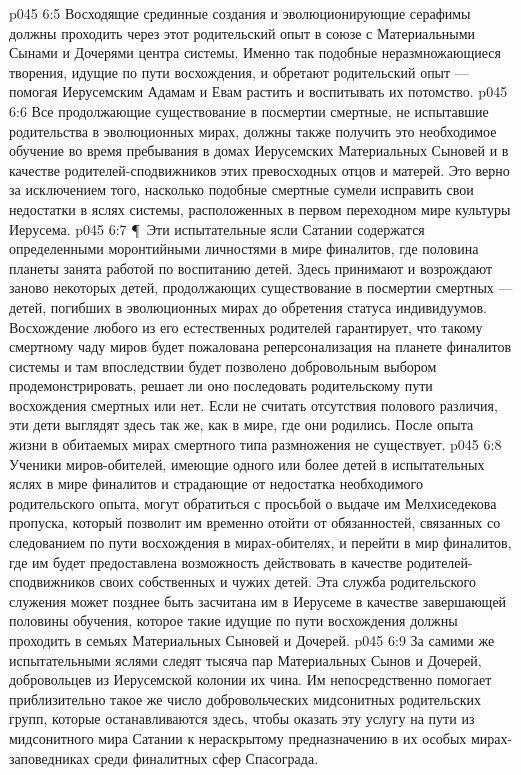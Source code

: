 \vs p045 6:5 Восходящие срединные создания и эволюционирующие серафимы должны проходить через этот родительский опыт в союзе с Материальными Сынами и Дочерями центра системы. Именно так подобные неразмножающиеся творения, идущие по пути восхождения, и обретают родительский опыт --- помогая Иерусемским Адамам и Евам растить и воспитывать их потомство.
\vs p045 6:6 Все продолжающие существование в посмертии смертные, не испытавшие родительства в эволюционных мирах, должны также получить это необходимое обучение во время пребывания в домах Иерусемских Материальных Сыновей и в качестве родителей\hyp{}сподвижников этих превосходных отцов и матерей. Это верно за исключением того, насколько подобные смертные сумели исправить свои недостатки в яслях системы, расположенных в первом переходном мире культуры Иерусема.
\vs p045 6:7 \P\ Эти испытательные ясли Сатании содержатся определенными моронтийными личностями в мире финалитов, где половина планеты занята работой по воспитанию детей. Здесь принимают и возрождают заново некоторых детей, продолжающих существование в посмертии смертных --- детей, погибших в эволюционных мирах до обретения статуса индивидуумов. Восхождение любого из его естественных родителей гарантирует, что такому смертному чаду миров будет пожалована реперсонализация на планете финалитов системы и там впоследствии будет позволено добровольным выбором продемонстрировать, решает ли оно последовать родительскому пути восхождения смертных или нет. Если не считать отсутствия полового различия, эти дети выглядят здесь так же, как в мире, где они родились. После опыта жизни в обитаемых мирах смертного типа размножения не существует.
\vs p045 6:8 Ученики миров\hyp{}обителей, имеющие одного или более детей в испытательных яслях в мире финалитов и страдающие от недостатка необходимого родительского опыта, могут обратиться с просьбой о выдаче им Мелхиседекова пропуска, который позволит им временно отойти от обязанностей, связанных со следованием по пути восхождения в мирах\hyp{}обителях, и перейти в мир финалитов, где им будет предоставлена возможность действовать в качестве родителей\hyp{}сподвижников своих собственных и чужих детей. Эта служба родительского служения может позднее быть засчитана им в Иерусеме в качестве завершающей половины обучения, которое такие идущие по пути восхождения должны проходить в семьях Материальных Сыновей и Дочерей.
\vs p045 6:9 За самими же испытательными яслями следят тысяча пар Материальных Сынов и Дочерей, добровольцев из Иерусемской колонии их чина. Им непосредственно помогает приблизительно такое же число добровольческих мидсонитных родительских групп, которые останавливаются здесь, чтобы оказать эту услугу на пути из мидсонитного мира Сатании к нераскрытому предназначению в их особых мирах\hyp{}заповедниках среди финалитных сфер Спасограда.
